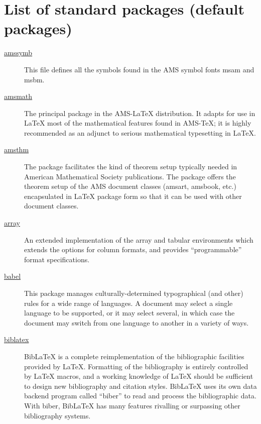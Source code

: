 
\section{List of standard packages (default packages)}
\label{app:packages}
\begin{description}
	\item[\href{https://www.ctan.org/pkg/amsfonts}{amssymb}] This file defines all the symbols found in the AMS symbol fonts msam and msbm. \cite{CTANTeam.2020bg}
	
	\item[\href{https://www.ctan.org/pkg/amsmath}{amsmath}] The principal package in the AMS-{\LaTeX} distribution. It adapts for use in {\LaTeX} most of the mathematical features found in AMS-{\TeX}; it is highly recommended as an adjunct to serious mathematical typesetting in {\LaTeX}. \cite{CTANTeam.2020r}
	
	\item[\href{https://www.ctan.org/pkg/amsthm}{amsthm}] The package facilitates the kind of theorem setup typically needed in American Mathematical Society publications. The package offers the theorem setup of the AMS document classes (amsart, amsbook, etc.) encapsulated in {\LaTeX} package form so that it can be used with other document classes. \cite{CTANTeam.2020ac}
	
	\item[\href{https://www.ctan.org/pkg/array}{array}] An extended implementation of the array and tabular environments which extends the options for column formats, and provides \enquote{programmable} format specifications. \cite{CTANTeam.2020bb}
	
	\item[\href{https://www.ctan.org/pkg/babel}{babel}] This package manages culturally-determined typographical (and other) rules for a wide range of languages. A document may select a single language to be supported, or it may select several, in which case the document may switch from one language to another in a variety of ways. \cite{CTANTeam.2020}
	
	\item[\href{https://www.ctan.org/pkg/biblatex}{biblatex}] Bib{\LaTeX} is a complete reimplementation of the bibliographic facilities provided by {\LaTeX}. Formatting of the bibliography is entirely controlled by {\LaTeX} macros, and a working knowledge of {\LaTeX} should be sufficient to design new bibliography and citation styles. Bib{\LaTeX} uses its own data backend program called \enquote{biber} to read and process the bibliographic data. With biber, Bib{\LaTeX} has many features rivalling or surpassing other bibliography systems. \cite{CTANTeam.2020ag}
	

\end{description}
